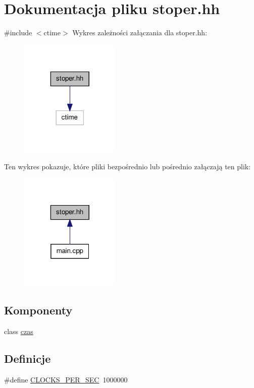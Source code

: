 \hypertarget{stoper_8hh}{\section{\-Dokumentacja pliku stoper.\-hh}
\label{stoper_8hh}
}
{\ttfamily \#include $<$ctime$>$}\*
\-Wykres zależności załączania dla stoper.\-hh\-:\nopagebreak
\begin{figure}[H]
\begin{center}
\leavevmode
\includegraphics[width=136pt]{stoper_8hh__incl}
\end{center}
\end{figure}
\-Ten wykres pokazuje, które pliki bezpośrednio lub pośrednio załączają ten plik\-:\nopagebreak
\begin{figure}[H]
\begin{center}
\leavevmode
\includegraphics[width=136pt]{stoper_8hh__dep__incl}
\end{center}
\end{figure}
\subsection*{\-Komponenty}
\begin{DoxyCompactItemize}
\item 
class \hyperlink{classczas}{czas}
\end{DoxyCompactItemize}
\subsection*{\-Definicje}
\begin{DoxyCompactItemize}
\item 
\#define \hyperlink{stoper_8hh_a3d9fc3c745d0880902fe3ea3d5d5f71e}{\-C\-L\-O\-C\-K\-S\-\_\-\-P\-E\-R\-\_\-\-S\-E\-C}~1000000
\end{DoxyCompactItemize}


